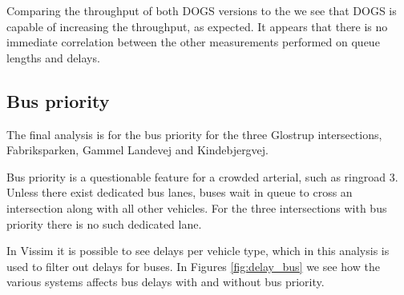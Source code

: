 Comparing the throughput of both DOGS versions to the we see that DOGS is capable of increasing the throughput, as expected. It appears that there is no immediate correlation between the other measurements performed on queue lengths and delays.

\subsection{Bus priority}
The final analysis is for the bus priority for the three Glostrup intersections, Fabriksparken, Gammel Landevej and Kindebjergvej.

Bus priority is a questionable feature for a crowded arterial, such as ringroad 3. Unless there exist dedicated bus lanes, buses wait in queue to cross an intersection along with all other vehicles. For the three intersections with bus priority there is no such dedicated lane.

In Vissim it is possible to see delays per vehicle type, which in this analysis is used to filter out delays for buses.
In Figures \ref{fig:delay_bus} we see how the various systems affects bus delays with and without bus priority.

